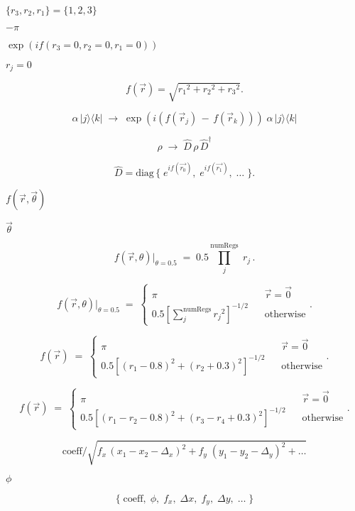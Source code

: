 \documentclass{article}
\begin{document}
$\{r_3,r_2,r_1\} = \{1,2,3\}$
\pagebreak

$-\pi$
\pagebreak

$\exp(i f(r_3=0,r_2=0,r_1=0))$
\pagebreak

$r_j=0$
\pagebreak

\[
     f(\vec{r}) = \sqrt{ {r_1}^2 + {r_2}^2 + {r_3} ^2 }.
  \]
\pagebreak

\[
     \alpha \, |j\rangle\langle k| \; \rightarrow \;
         \exp(i (f(\vec{r}_j) \, - \, f(\vec{r}_k))) \; \alpha \, |j\rangle\langle k|
  \]
\pagebreak

\[
         \rho \; \rightarrow \; \hat{D} \, \rho \, \hat{D}^\dagger
  \]
\pagebreak

\[
     \hat{D} = \text{diag}\, \{ \; e^{i f(\vec{r_0})}, \; e^{i f(\vec{r_1})}, \; \dots \; \}.
  \]
\pagebreak

$f(\vec{r}, \vec{\theta})$
\pagebreak

$\vec{\theta}$
\pagebreak

\[
     f(\vec{r}, \theta)|_{\theta=0.5} \; = \; 0.5 \prod_j^{\text{numRegs}} \; r_j\,.
  \]
\pagebreak

\[
     f(\vec{r}, \theta)|_{\theta=0.5} \; = \; \begin{cases} \pi & \;\;\; \vec{r}=\vec{0} \\ \displaystyle 0.5 \left[ \sum_j^{\text{numRegs}} {r_j}^2 \right]^{-1/2} & \;\;\;\text{otherwise} \end{cases}.
  \]
\pagebreak

\[
     f(\vec{r}) \; = \; \begin{cases} \pi & \;\;\; \vec{r}=\vec{0} \\ \displaystyle 0.5 \left[(r_1-0.8)^2 + (r_2+0.3)^2\right]^{-1/2} & \;\;\;\text{otherwise} \end{cases}.
  \]
\pagebreak

\[
     f(\vec{r}) \; = \; \begin{cases} \pi & \;\;\; \vec{r}=\vec{0} \\ \displaystyle 0.5 \left[(r_1-r_2-0.8)^2 + (r_3-r_4+0.3)^2\right]^{-1/2} & \;\;\;\text{otherwise} \end{cases}.
  \]
\pagebreak

\[
     \text{coeff}/\sqrt{f_x \, (x_1-x_2-\Delta_x)^2 + f_y \; (y_1-y_2-\Delta_y)^2 + \dots}
  \]
\pagebreak

$\phi$
\pagebreak

\[
     \{  \; \text{coeff}, \; \phi, \; f_x, \; \Delta x, \; f_y, \; \Delta y, \; \dots \;   \}
  \]
\pagebreak
\end{document}

